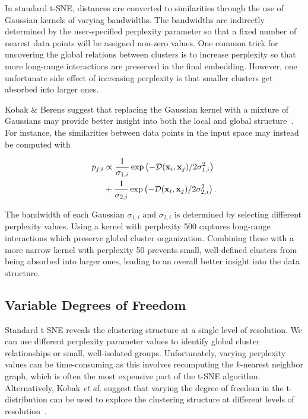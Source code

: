 \documentclass[letter]{article}
\begin{document}
In standard t-SNE, distances are converted to similarities through the use of
Gaussian kernels of varying bandwidths. The bandwidths are indirectly determined
by the user-specified perplexity parameter so that a fixed number of nearest
data points will be assigned non-zero values. One common trick for uncovering
the global relations between clusters is to increase perplexity so that more
long-range interactions are preserved in the final embedding.  However, one
unfortunate side effect of increasing perplexity is that smaller clusters get
absorbed into larger ones.

Kobak \& Berens suggest that replacing the Gaussian kernel with a mixture of
Gaussians may provide better insight into both the local and global
structure~\cite{kobak2019art}. For instance, the similarities between data
points in the input space may instead be computed with

\begin{align}
  p_{j\mid i} &\propto \frac{1}{\sigma_{1,i}} \exp \left ( -\mathcal{D}(\mathbf{x}_i, \mathbf{x}_j ) / 2\sigma_{1,i}^2 \right ) \notag \\
  &+ \frac{1}{\sigma_{2,i}} \exp \left ( -\mathcal{D}(\mathbf{x}_i, \mathbf{x}_j ) / 2\sigma_{2,i}^2 \right ).
\end{align}

The bandwidth of each Gaussian $\sigma_{1,i}$ and $\sigma_{2,i}$ is determined
by selecting different perplexity values. Using a kernel with perplexity 500
captures long-range interactions which preserve global cluster organization.
Combining these with a more narrow kernel with perplexity 50 prevents small,
well-defined clusters from being absorbed into larger ones, leading to an overall better
insight into the data structure.

\subsection*{Variable Degrees of Freedom}

Standard t-SNE reveals the clustering structure at a single level of resolution.
We can use different perplexity parameter values to identify global cluster
relationships or small, well-isolated groups. Unfortunately, varying perplexity
values can be time-consuming as this involves recomputing the $k$-nearest neighbor graph, which is often the most expensive part of the t-SNE algorithm.
Alternatively, Kobak \textit{et al.} suggest that varying the degree of freedom
in the t-distribution can be used to explore the clustering structure at
different levels of resolution~\cite{kobak2019heavy}. 
\end{document}
